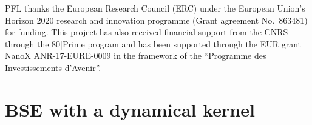 \documentclass[aip,jcp,reprint,noshowkeys,superscriptaddress]{revtex4-1}
\begin{document}
\begin{acknowledgements}
PFL thanks the European Research Council (ERC) under the European Union's Horizon 2020 research and innovation programme (Grant agreement No.~863481) for funding.
This project has also received financial support from the CNRS through the 80|Prime program and has been supported through the EUR grant NanoX ANR-17-EURE-0009 in the framework of the ``Programme des Investissements d’Avenir''.
\end{acknowledgements}

\onecolumngrid
\appendix
\section{BSE with a dynamical kernel}
\end{document}
